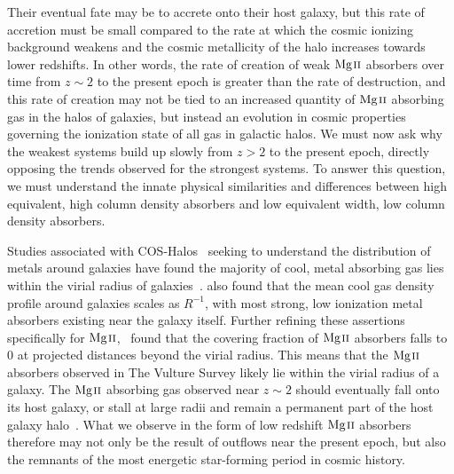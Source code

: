 Their eventual fate may be to accrete onto their host galaxy, but this rate of accretion must be small compared to the rate at which the cosmic ionizing background weakens and the cosmic metallicity of the halo increases towards lower redshifts. In other words, the rate of creation of weak ${\hbox{{\rm Mg}\kern 0.1em{\sc ii}}}$ absorbers over time from $z \sim 2$ to the present epoch is greater than the rate of destruction, and this rate of creation may not be tied to an increased quantity of ${\hbox{{\rm Mg}\kern 0.1em{\sc ii}}}$ absorbing gas in the halos of galaxies, but instead an evolution in cosmic properties governing the ionization state of all gas in galactic halos. We must now ask why the weakest systems build up slowly from $z > 2$ to the present epoch, directly opposing the trends observed for the strongest systems. To answer this question, we must understand the innate physical similarities and differences between high equivalent, high column density absorbers and low equivalent width, low column density absorbers.

Studies associated with COS-Halos~\citep{Tumlinson2011} seeking to understand the distribution of metals around galaxies have found the majority of cool, metal absorbing gas lies within the virial radius of galaxies~\citep{Peeples2014}. \cite{Stern2016} also found that the mean cool gas density profile around galaxies scales as $R^{-1}$, with most strong, low ionization metal absorbers existing near the galaxy itself. Further refining these assertions specifically for ${\hbox{{\rm Mg}\kern 0.1em{\sc ii}}}$,~\cite{Churchill2013letter} found that the covering fraction of ${\hbox{{\rm Mg}\kern 0.1em{\sc ii}}}$ absorbers falls to $0$ at projected distances beyond the virial radius. This means that the ${\hbox{{\rm Mg}\kern 0.1em{\sc ii}}}$ absorbers observed in The Vulture Survey likely lie within the virial radius of a galaxy. The ${\hbox{{\rm Mg}\kern 0.1em{\sc ii}}}$ absorbing gas observed near $z \sim 2$ should eventually fall onto its host galaxy, or stall at large radii and remain a permanent part of the host galaxy halo~\citep{Oppenheimer2010,Ford2014}. What we observe in the form of low redshift ${\hbox{{\rm Mg}\kern 0.1em{\sc ii}}}$ absorbers therefore may not only be the result of outflows near the present epoch, but also the remnants of the most energetic star-forming period in cosmic history.

